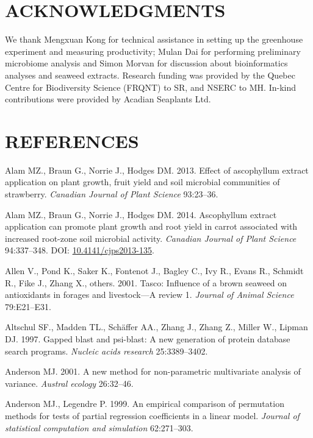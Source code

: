 \documentclass[12pt,]{article}
\begin{document}
\section{ACKNOWLEDGMENTS}\label{acknowledgments}

We thank Mengxuan Kong for technical assistance in setting up the
greenhouse experiment and measuring productivity; Mulan Dai for
performing preliminary microbiome analysis and Simon Morvan for
discussion about bioinformatics analyses and seaweed extracts. Research
funding was provided by the Quebec Centre for Biodiversity Science
(FRQNT) to SR, and NSERC to MH. In-kind contributions were provided by
Acadian Seaplants Ltd. \newpage  

\section*{REFERENCES}\label{references}

\hypertarget{refs}{}
\hypertarget{ref-alam2013effect}{}
Alam MZ., Braun G., Norrie J., Hodges DM. 2013. Effect of ascophyllum
extract application on plant growth, fruit yield and soil microbial
communities of strawberry. \emph{Canadian Journal of Plant Science}
93:23--36.

\hypertarget{ref-Alam2014}{}
Alam MZ., Braun G., Norrie J., Hodges DM. 2014. Ascophyllum extract
application can promote plant growth and root yield in carrot associated
with increased root-zone soil microbial activity. \emph{Canadian Journal
of Plant Science} 94:337--348. DOI:
\href{https://doi.org/10.4141/cjps2013-135}{10.4141/cjps2013-135}.

\hypertarget{ref-allen2001tasco}{}
Allen V., Pond K., Saker K., Fontenot J., Bagley C., Ivy R., Evans R.,
Schmidt R., Fike J., Zhang X., others. 2001. Tasco: Influence of a brown
seaweed on antioxidants in forages and livestock---A review 1.
\emph{Journal of Animal Science} 79:E21--E31.

\hypertarget{ref-altschul1997gapped}{}
Altschul SF., Madden TL., Schäffer AA., Zhang J., Zhang Z., Miller W.,
Lipman DJ. 1997. Gapped blast and psi-blast: A new generation of protein
database search programs. \emph{Nucleic acids research} 25:3389--3402.

\hypertarget{ref-anderson2001new}{}
Anderson MJ. 2001. A new method for non-parametric multivariate analysis
of variance. \emph{Austral ecology} 26:32--46.

\hypertarget{ref-anderson1999empirical}{}
Anderson MJ., Legendre P. 1999. An empirical comparison of permutation
methods for tests of partial regression coefficients in a linear model.
\emph{Journal of statistical computation and simulation} 62:271--303.
\end{document}
